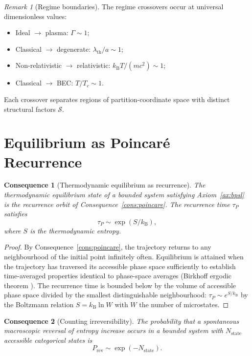 \documentclass[11pt,twocolumn,a4paper]{article}
\theoremstyle{axiomstyle}
\theoremstyle{conseqstyle}
\newtheorem{consequence}{Consequence}
\theoremstyle{definition}
\theoremstyle{remark}
\newtheorem*{remark}{Remark}
\newcommand{\kB}{k_{\mathrm{B}}}
\begin{document}
\begin{remark}[Regime boundaries]
The regime crossovers occur at universal dimensionless values:
\begin{itemize}[nosep]
\item Ideal $\to$ plasma: $\Gamma\sim 1$;
\item Classical $\to$ degenerate: $\lambda_{\mathrm{th}}/a\sim 1$;
\item Non-relativistic $\to$ relativistic: $\kB T/(mc^{2})\sim 1$;
\item Classical $\to$ BEC: $T/T_{c}\sim 1$.
\end{itemize}
Each crossover separates regions of partition-coordinate space with distinct structural factors $\mathcal{S}$.
\end{remark}

\section{Equilibrium as Poincar\'e Recurrence}
\label{sec:equilibriumrecurrence}

\begin{consequence}[Thermodynamic equilibrium as recurrence]\label{cons:equilibriumrecurrence}
The thermodynamic equilibrium state of a bounded system satisfying Axiom~\ref{ax:bpsl} is the recurrence orbit of Consequence~\ref{cons:poincare}. The recurrence time $\tau_{P}$ satisfies
\begin{equation}
\tau_{P}\sim\exp(S/\kB),
\end{equation}
where $S$ is the thermodynamic entropy.
\end{consequence}

\begin{proof}
By Consequence~\ref{cons:poincare}, the trajectory returns to any neighbourhood of the initial point infinitely often. Equilibrium is attained when the trajectory has traversed its accessible phase space sufficiently to establish time-averaged properties identical to phase-space averages (Birkhoff ergodic theorem \citep{birkhoff1931}). The recurrence time is bounded below by the volume of accessible phase space divided by the smallest distinguishable neighbourhood: $\tau_{P}\sim e^{S/\kB}$ by the Boltzmann relation $S=\kB\ln W$ with $W$ the number of microstates.
\end{proof}

\begin{consequence}[Counting irreversibility]\label{cons:countingirrev}
The probability that a spontaneous macroscopic reversal of entropy increase occurs in a bounded system with $N_{\mathrm{state}}$ accessible categorical states is
\begin{equation}
P_{\mathrm{rev}}\sim\exp(-N_{\mathrm{state}}).
\end{equation}
\end{consequence}
\end{document}
